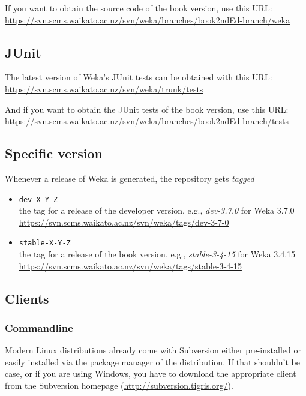 \noindent If you want to obtain the source code of the book version, use this URL:\\

\url{https://svn.scms.waikato.ac.nz/svn/weka/branches/book2ndEd-branch/weka}{}\\

\subsection{JUnit}
The latest version of Weka's JUnit tests can be obtained with this URL:\\

\url{https://svn.scms.waikato.ac.nz/svn/weka/trunk/tests}{}

\noindent And if you want to obtain the JUnit tests of the book version, use this URL:\\

\url{https://svn.scms.waikato.ac.nz/svn/weka/branches/book2ndEd-branch/tests}{}

\subsection{Specific version}
Whenever a release of Weka is generated, the repository gets \textit{tagged}

\begin{itemize}
\item \verb=dev-X-Y-Z=\\the tag for a release of the developer version, e.g., \textit{dev-3.7.0} for Weka 3.7.0\\
\url{https://svn.scms.waikato.ac.nz/svn/weka/tags/dev-3-7-0}{}
\item \verb=stable-X-Y-Z=\\ the tag for a release of the book version, e.g., \textit{stable-3-4-15} for Weka 3.4.15\\
\url{https://svn.scms.waikato.ac.nz/svn/weka/tags/stable-3-4-15}{}
\end{itemize}

\subsection{Clients}
\subsubsection*{Commandline}
Modern Linux distributions already come with Subversion either
pre-installed or easily installed via the package manager of the
distribution. If that shouldn't be case, or if you are using Windows,
you have to download the appropriate client from the Subversion
homepage (\url{http://subversion.tigris.org/}{}).

